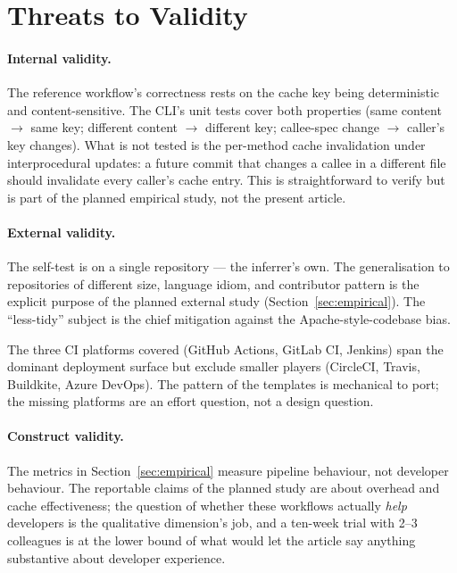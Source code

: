 \section{Threats to Validity}
\label{sec:threats}

\paragraph{Internal validity.}
The reference workflow's correctness rests on the cache key being deterministic and content-sensitive. The CLI's unit tests cover both properties (same content $\to$ same key; different content $\to$ different key; callee-spec change $\to$ caller's key changes). What is not tested is the per-method cache invalidation under interprocedural updates: a future commit that changes a callee in a different file should invalidate every caller's cache entry. This is straightforward to verify but is part of the planned empirical study, not the present article.

\paragraph{External validity.}
The self-test is on a single repository --- the inferrer's own. The generalisation to repositories of different size, language idiom, and contributor pattern is the explicit purpose of the planned external study (Section~\ref{sec:empirical}). The ``less-tidy'' subject is the chief mitigation against the Apache-style-codebase bias.

The three CI platforms covered (GitHub Actions, GitLab CI, Jenkins) span the dominant deployment surface but exclude smaller players (CircleCI, Travis, Buildkite, Azure DevOps). The pattern of the templates is mechanical to port; the missing platforms are an effort question, not a design question.

\paragraph{Construct validity.}
The metrics in Section~\ref{sec:empirical} measure pipeline behaviour, not developer behaviour. The reportable claims of the planned study are about overhead and cache effectiveness; the question of whether these workflows actually \emph{help} developers is the qualitative dimension's job, and a ten-week trial with 2--3 colleagues is at the lower bound of what would let the article say anything substantive about developer experience.


